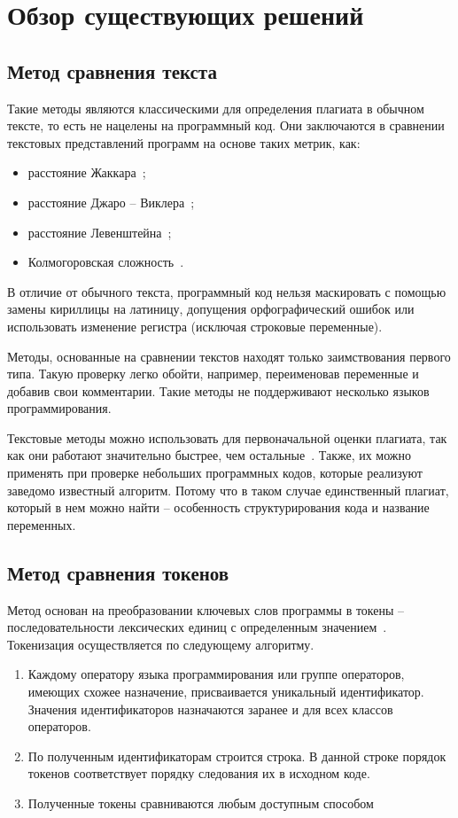\section{Обзор существующих решений}

\subsection{Метод сравнения текста}
Такие методы являются классическими для определения плагиата в обычном тексте, то есть не нацелены на программный код. Они заключаются в сравнении текстовых представлений программ на основе таких метрик, как:
\begin{itemize}[label*=---]
	\item расстояние Жаккара~\cite{Jaccard};
	\item расстояние Джаро -- Виклера~\cite{Jaro};
	\item расстояние Левенштейна~\cite{Lev};
	\item Колмогоровская сложность~\cite{Kolm}.
\end{itemize}

В отличие от обычного текста, программный код нельзя маскировать с помощью замены кириллицы на латиницу, допущения орфографический ошибок или использовать изменение регистра (исключая строковые переменные).

Методы, основанные на сравнении текстов находят только заимствования первого типа. Такую проверку легко обойти, например, переименовав переменные и добавив свои комментарии. Такие методы не поддерживают несколько языков программирования. 

Текстовые методы можно использовать для первоначальной оценки плагиата, так как они работают значительно быстрее, чем остальные~\cite{text}. Также, их можно применять при проверке небольших программных кодов, которые реализуют заведомо известный алгоритм. Потому что в таком случае единственный плагиат, который в нем можно найти -- особенность структурирования кода и название переменных. 

\subsection{Метод сравнения токенов}
Метод основан на преобразовании ключевых слов программы в токены -- последовательности лексических единиц с определенным значением~\cite{token}. 
\pagebreak
Токенизация осуществляется по следующему алгоритму.
\begin{enumerate}
	\item Каждому оператору языка программирования или группе операторов, имеющих схожее назначение, присваивается уникальный идентификатор. Значения идентификаторов назначаются заранее и для
	всех классов операторов.
	\item По полученным идентификаторам строится строка. В данной строке порядок токенов соответствует порядку следования их в исходном коде.
	\item Полученные токены сравниваются любым доступным способом
\end{enumerate}

